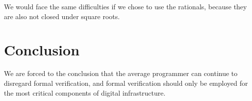 \documentclass{article}
\begin{document}
We would face the same difficulties if we chose to use the rationals, because they are also not closed under square roots.

\section{Conclusion}
We are forced to the conclusion that the average programmer can continue to disregard formal verification, and formal verification should only be employed for the most critical components of digital infrastructure.



\end{document}

